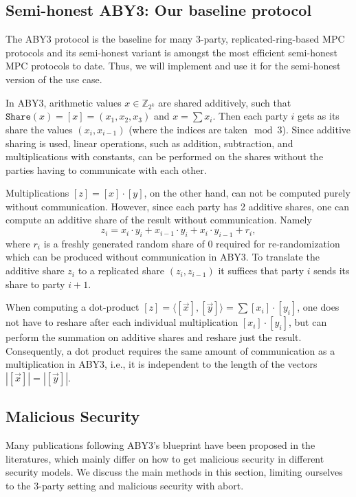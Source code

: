 \documentclass[a4paper,11pt,
]{article}
\newcommand{\Z}{\ensuremath{\mathbb{Z}}\xspace}
\newcommand{\shared}[1]{\ensuremath{[{#1}]}}
\begin{document}
\subsection{Semi-honest ABY3: Our baseline protocol}

The ABY3 \cite{DBLP:conf/ccs/MohasselR18} protocol is the baseline for many 3-party, replicated-ring-based MPC protocols and its semi-honest variant is amongst the most efficient semi-honest MPC protocols to date. Thus, we will implement and use it for the semi-honest version of the use case.

In ABY3, arithmetic values $x \in \Z_{2^k}$ are shared additively, such that $\texttt{Share}(x) = \shared{x} = (x_1, x_2, x_3)$ and $x = \sum x_i$. Then each party $i$ gets as its share the values $(x_i, x_{i-1})$ (where the indices are taken$\mod 3$). Since additive sharing is used, linear operations, such as addition, subtraction, and multiplications with constants, can be performed on the shares without the parties having to communicate with each other.

Multiplications $\shared{z} = \shared{x} \cdot \shared{y}$, on the other hand, can not be computed purely without communication. However, since each party has 2 additive shares, one can compute an additive share of the result without communication. Namely
$$
    z_i = x_i \cdot y_i + x_{i-1} \cdot y_i + x_i \cdot y_{i-1} + r_i,
$$
where $r_i$ is a freshly generated random share of 0 required for re-randomization which can be produced without communication in ABY3.
To translate the additive share $z_i$ to a replicated share $(z_i, z_{i-1})$ it suffices that party $i$ sends its share to party $i+1$.

When computing a dot-product $\shared{z} = \langle\shared{\vec{x}}, \shared{\vec{y}}\rangle = \sum \shared{x_i} \cdot \shared{y_i}$, one does not have to reshare after each individual multiplication $\shared{x_i} \cdot \shared{y_i}$, but can perform the summation on additive shares and reshare just the result. Consequently, a dot product requires the same amount of communication as a multiplication in ABY3, i.e., it is independent to the length of the vectors $|\shared{\vec{x}}| = |\shared{\vec{y}}|$.

\subsection{Malicious Security}

Many publications following ABY3's blueprint have been proposed in the literatures, which mainly differ on how to get malicious security in different security models. We discuss the main methods in this section, limiting ourselves to the 3-party setting and malicious security with abort.
\end{document}
